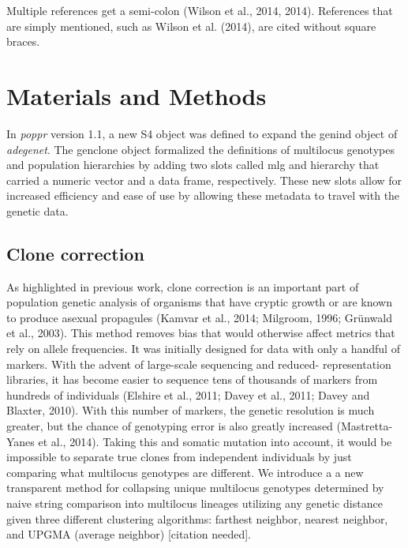 \documentclass{frontiersSCNS} %
\begin{document}
Multiple references get a semi-colon (Wilson et al., 2014, 2014).
References that are simply mentioned, such as Wilson et al. (2014), are
cited without square braces.

\section*{Materials and Methods}\label{materials-and-methods}

In \emph{poppr} version 1.1, a new S4 object was defined to expand the
genind object of \emph{adegenet}. The genclone object formalized the
definitions of multilocus genotypes and population hierarchies by adding
two slots called mlg and hierarchy that carried a numeric vector and a
data frame, respectively. These new slots allow for increased efficiency
and ease of use by allowing these metadata to travel with the genetic
data.

\subsection*{Clone correction}\label{clone-correction}

As highlighted in previous work, clone correction is an important part
of population genetic analysis of organisms that have cryptic growth or
are known to produce asexual propagules (Kamvar et al., 2014; Milgroom,
1996; Grünwald et al., 2003). This method removes bias that would
otherwise affect metrics that rely on allele frequencies. It was
initially designed for data with only a handful of markers. With the
advent of large-scale sequencing and reduced- representation libraries,
it has become easier to sequence tens of thousands of markers from
hundreds of individuals (Elshire et al., 2011; Davey et al., 2011; Davey
and Blaxter, 2010). With this number of markers, the genetic resolution
is much greater, but the chance of genotyping error is also greatly
increased (Mastretta-Yanes et al., 2014). Taking this and somatic
mutation into account, it would be impossible to separate true clones
from independent individuals by just comparing what multilocus genotypes
are different. We introduce a a new transparent method for collapsing
unique multilocus genotypes determined by naive string comparison into
multilocus lineages utilizing any genetic distance given three different
clustering algorithms: farthest neighbor, nearest neighbor, and UPGMA
(average neighbor) {[}citation needed{]}.
\end{document}
